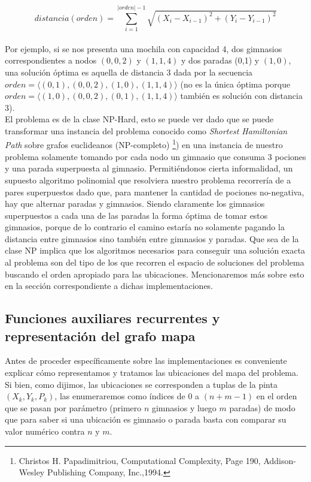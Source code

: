    $$ distancia(orden) = \sum_{i=1}^{|orden|-1} \sqrt{(X_i - X_{i-1})^2 + (Y_i - Y_{i-1})^2} $$
   \\

   Por ejemplo, si se nos presenta una mochila con capacidad 4, dos gimnasios correspondientes a nodos $(0,0,2)$ y $(1,1,4)$ y dos paradas (0,1) y $(1,0)$, una solución óptima es aquella de distancia 3 dada por la secuencia $orden =\langle {(0,1), (0,0,2), (1,0), (1,1,4)} \rangle$ (no es la única óptima porque $orden = \langle {(1,0), (0,0,2), (0,1), (1,1,4)} \rangle$ también es solución con distancia 3).
   \\

   El problema es de la clase NP-Hard, esto se puede ver dado que se puede transformar una instancia del problema conocido como \emph{Shortest Hamiltonian Path} sobre grafos euclideanos (NP-completo) \footnote{Christos H. Papadimitriou, Computational Complexity, Page 190, Addison-Wesley Publishing Company, Inc.,1994.}) en una instancia de nuestro problema solamente tomando por cada nodo un gimnasio que consuma 3 pociones y una parada superpuesta al gimnasio. Permitiéndonos cierta informalidad, un supuesto algoritmo polinomial que resolviera nuestro problema recorrería de a pares superpuestos dado que, para mantener la cantidad de pociones no-negativa, hay que alternar paradas y gimnasios. Siendo claramente los gimnasios superpuestos a cada una de las paradas la forma óptima de tomar estos gimnasios, porque de lo contrario el camino estaría no solamente pagando la distancia entre gimnasios sino también entre gimnasios y paradas. Que sea de la clase NP implica que los algoritmos necesarios para conseguir una solución exacta al problema son del tipo de los que recorren el espacio de soluciones del problema buscando el orden apropiado para las ubicaciones. Mencionaremos más sobre esto en la sección correspondiente a dichas implementaciones.

   \subsection{Funciones auxiliares recurrentes y representación del grafo mapa}

   Antes de proceder específicamente sobre las implementaciones es conveniente explicar cómo representamos y tratamos las ubicaciones del mapa del problema. Si bien, como dijimos, las ubicaciones se corresponden a tuplas de la pinta $(X_k, Y_k, P_k)$, las enumeraremos como índices de 0 a $(n + m - 1)$ en el orden que se pasan por parámetro (primero $n$ gimnasios y luego $m$ paradas) de modo que para saber si una ubicación es gimnasio o parada basta con comparar su valor numérico contra $n$ y $m$.
   \\

